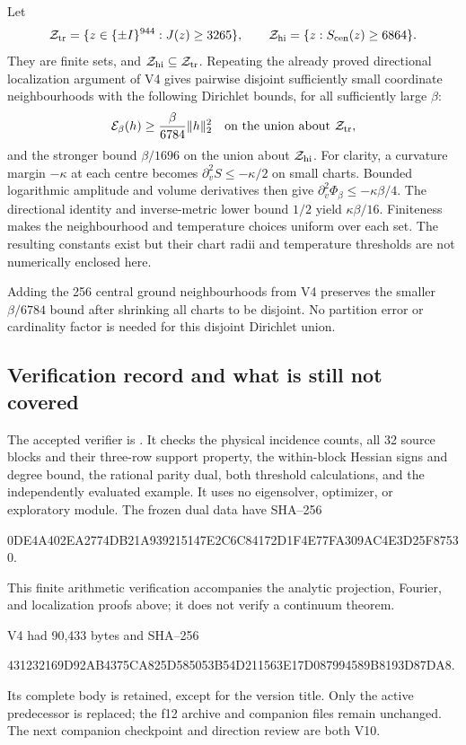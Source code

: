 \documentclass[11pt,oneside]{article}
\newcommand{\E}{\mathcal E}
\begin{document}
Let
\[
 \mathcal Z_{\rm tr}=\{z\in\{\pm I\}^{944}:J(z)\ge3265\},
 \qquad
 \mathcal Z_{\rm hi}=\{z:S_{\rm cen}(z)\ge6864\}.
\]
They are finite sets, and
\(\mathcal Z_{\rm hi}\subseteq\mathcal Z_{\rm tr}\).
Repeating the already proved directional localization
argument of V4 gives pairwise disjoint sufficiently
small coordinate neighbourhoods with the following
Dirichlet bounds, for all sufficiently large \(\beta\):
\[
 \E_\beta(h)\ge\frac{\beta}{6784}\|h\|_2^2
 \quad\hbox{on the union about }\mathcal Z_{\rm tr},
\]
and the stronger bound \(\beta/1696\) on the union
about \(\mathcal Z_{\rm hi}\).
For clarity, a curvature margin \(-\kappa\) at each
centre becomes \(\partial_v^2S\le-\kappa/2\) on
small charts. Bounded logarithmic amplitude and
volume derivatives then give
\(\partial_v^2\Phi_\beta\le-\kappa\beta/4\).
The directional identity and inverse-metric lower
bound \(1/2\) yield \(\kappa\beta/16\).
Finiteness makes the neighbourhood and temperature
choices uniform over each set. The resulting
constants exist but their chart radii and temperature
thresholds are not numerically enclosed here.

Adding the 256 central ground neighbourhoods from
V4 preserves the smaller \(\beta/6784\) bound after
shrinking all charts to be disjoint. No partition
error or cardinality factor is needed for this
disjoint Dirichlet union.

\subsection{Verification record and what is still not covered}

The accepted verifier is
.
It checks the physical incidence counts, all 32
source blocks and their three-row support property,
the within-block Hessian signs and degree bound,
the rational parity dual, both threshold calculations,
and the independently evaluated example. It uses
no eigensolver, optimizer, or exploratory module.
The frozen dual data have SHA--256
\begin{center}\scriptsize\ttfamily
0DE4A402EA2774DB21A939215147E2C6C84172D1F4E77FA309AC4E3D25F87530.
\end{center}
This finite arithmetic verification accompanies
the analytic projection, Fourier, and localization
proofs above; it does not verify a continuum theorem.

V4 had 90,433 bytes and SHA--256
\begin{center}\scriptsize\ttfamily
431232169D92AB4375CA825D585053B54D211563E17D087994589B8193D87DA8.
\end{center}
Its complete body is retained, except for the
version title. Only the active predecessor is
replaced; the f12 archive and companion files
remain unchanged. The next companion checkpoint
and direction review are both V10.
\end{document}
